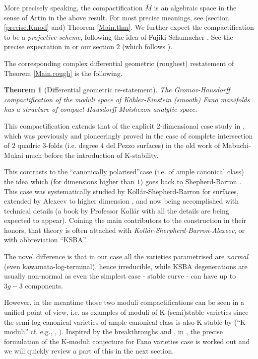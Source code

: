 \documentclass[12pt]{amsart}
\newtheorem{Thm}{Theorem}[section]
\theoremstyle{remark}
\theoremstyle{definition}
\begin{document}
More precisely speaking, the compactification $\bar{M}$ 
is an algebraic space in the sense of Artin \cite{Art} in the above result. 
For most precise meanings, 
see (section \ref{precise.Kmod} and) Theorem \ref{Main.thm}. 
We further expect the compactification to be a
\textit{projective scheme}, following the idea of Fujiki-Schumacher \cite{FS}. 
See the precise expectation in \cite[subsections 3.4, 6.2]{OSS} or our section $2$ (which 
follows \cite{OSS}). 

The corresponding complex differential geometric (roughest) restatement of 
Theorem \ref{Main.rough} is the following. 

\begin{Thm}[Differential geometric re-statement]\label{Main.rough.DG}
The Gromov-Hausdorff compactification of the moduli space of 
K\"ahler-Einstein (smooth) Fano manifolds 
has a structure of compact Hausdorff Moishezon analytic space. 
\end{Thm}

This compactification extends that of the explicit 
$2$-dimensional case study in \cite{OSS}, which was previously and pioneeringly 
proved in the case of complete intersection of $2$ quadric $3$-folds (i.e. degree $4$ del Pezzo 
surfaces) in the old work of Mabuchi-Mukai \cite{MM} much before the 
introduction of K-stability. 

This contrasts to the ``canonically polarised''case (i.e. of ample canonical class) the idea which (for dimensions higher than $1$) goes back to Shepherd-Barron 
\cite{SB}. 
This case was systematically studied by Koll\'ar-Shepherd-Barron \cite{KSB} for surfaces, 
extended by Alexeev to higher dimension \cite{Ale}, 
and now being accomplished with technical details (a book by Professor 
Koll\'ar \cite{Kol} with all the details are being expected to appear). 
Coining the main contributors to the construction in their honors, 
that theory is often attached with 
\textit{Koll\'ar-Sherpherd-Barron-Alexeev}, or with abbreviation ``KSBA''. 

The novel difference is that in our case 
all the varieties parametrised are 
\textit{normal} (even kawamata-log-terminal), hence irreducible, 
while KSBA degenerations are 
usually non-normal as even the simplest case - stable curve \cite{DM} - 
can have up to $3g-3$ components. 

However, in the meantime those two moduli compactifications can be seen 
in a unified point of view, i.e. as 
examples of moduli of K-(semi)stable varieties since the 
semi-log-canonical varieties of ample canonical class is also K-stable by 
\cite{Od1} (``K-moduli'' cf. e.g., \cite[section 5]{Od0}, \cite[Chapter 1]{Spo}). 
Inspired by the breakthroughs \cite{DS} and \cite{Spo}, 
in \cite[Conjecture 6.2]{OSS}, 
the precise formulation of the K-moduli conjecture for Fano varieties case is worked out and 
we will quickly review a part of this in the next section. 
\end{document}
